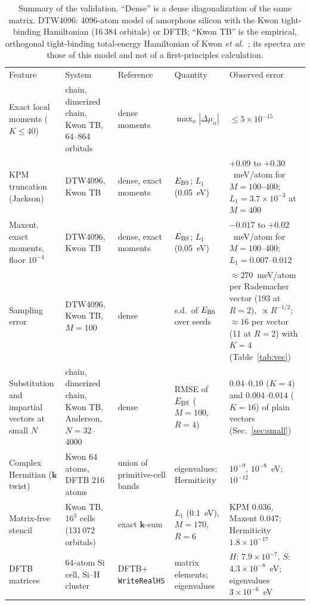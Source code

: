 \documentclass[reprint,nofootinbib,superscriptaddress,amsmath,amssymb,aps,prb,floatfix]{revtex4-2}
\begin{document}
\begin{table}
\caption{Summary of the validation. ``Dense'' is a dense diagonalization of the same matrix. DTW4096: 4096-atom model of amorphous silicon with the Kwon tight-binding Hamiltonian (16\,384 orbitals) or DFTB; ``Kwon TB'' is the empirical, orthogonal tight-binding total-energy Hamiltonian of Kwon \emph{et al.}\ \cite{kwon}; its spectra are those of this model and not of a first-principles calculation.}
\label{tab:valsum}
\begin{ruledtabular}
\begin{tabular}{p{2.9cm}p{3.1cm}p{2.6cm}p{2.9cm}p{4.6cm}}
Feature & System & Reference & Quantity & Observed error \\ \colrule
Exact local moments ($K\le40$) & chain, dimerized chain, Kwon TB, 64--864 orbitals & dense moments & $\max_n|\Delta\mu_n|$ & $\le5\times10^{-15}$ \\
KPM truncation (Jackson) & DTW4096, Kwon TB & dense, exact moments & $E_{\rm BS}$; $L_1$ (0.05~eV) & $+0.09$ to $+0.30$~meV/atom for $M=100$--400; $L_1=3.7\times10^{-3}$ at $M=400$ \\
Maxent, exact moments, floor $10^{-4}$ & DTW4096, Kwon TB & dense, exact moments & $E_{\rm BS}$; $L_1$ (0.05~eV) & $-0.017$ to $+0.02$~meV/atom for $M=100$--400; $L_1=0.007$--$0.012$ \\
Sampling error & DTW4096, Kwon TB, $M=100$ & dense & s.d.\ of $E_{\rm BS}$ over seeds & $\approx270$~meV/atom per Rademacher vector (193 at $R=2$), $\propto R^{-1/2}$; $\approx16$ per vector (11 at $R=2$) with $K=4$ (Table~\ref{tab:vec}) \\
Substitution and impartial vectors at small $N$ & chain, dimerized chain, Kwon TB, Anderson, $N=32$--4000 & dense & RMSE of $E_{\rm BS}$ ($M=100$, $R=4$) & $0.04$--$0.10$ ($K=4$) and $0.004$--$0.014$ ($K=16$) of plain vectors (Sec.~\ref{sec:small}) \\
Complex Hermitian ($\mathbf k$ twist) & Kwon 64 atoms, DFTB 216 atoms & union of primitive-cell bands & eigenvalues; Hermiticity & $10^{-9}$, $10^{-8}$~eV; $10^{-12}$ \\
Matrix-free stencil & Kwon TB, $16^3$ cells (131\,072 orbitals) & exact $\mathbf k$-sum & $L_1$ (0.1~eV), $M=170$, $R=6$ & KPM 0.036, Maxent 0.047; Hermiticity $1.8\times10^{-17}$ \\
DFTB matrices & 64-atom Si cell, Si--H cluster & DFTB+ \texttt{WriteRealHS} & matrix elements; eigenvalues & $H$: $7.9\times10^{-7}$, $S$: $4.3\times10^{-8}$~eV; eigenvalues $3\times10^{-6}$~eV \\

\end{tabular}
\end{ruledtabular}
\end{table}
\end{document}
